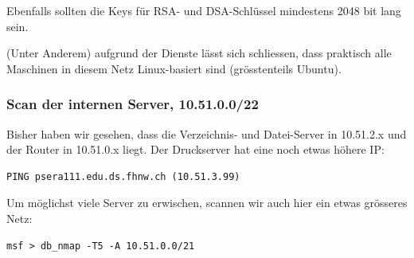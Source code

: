 \documentclass[a4paper,11pt]{scrartcl}
\begin{document}
Ebenfalls sollten die Keys für RSA- und DSA-Schlüssel mindestens 2048 bit lang sein.

(Unter Anderem) aufgrund der Dienste lässt sich schliessen, dass praktisch alle Maschinen in diesem Netz Linux-basiert sind (grösstenteils Ubuntu).

\subsubsection{Scan der internen Server, 10.51.0.0/22}
Bisher haben wir gesehen, dass die Verzeichnis- und Datei-Server in 10.51.2.x und der Router in 10.51.0.x liegt. Der Druckserver hat eine noch etwas höhere IP:
\begin{verbatim}PING psera111.edu.ds.fhnw.ch (10.51.3.99)\end{verbatim}
Um möglichst viele Server zu erwischen, scannen wir auch hier ein etwas grösseres Netz:
\begin{verbatim}msf > db_nmap -T5 -A 10.51.0.0/21\end{verbatim}
\end{document}

